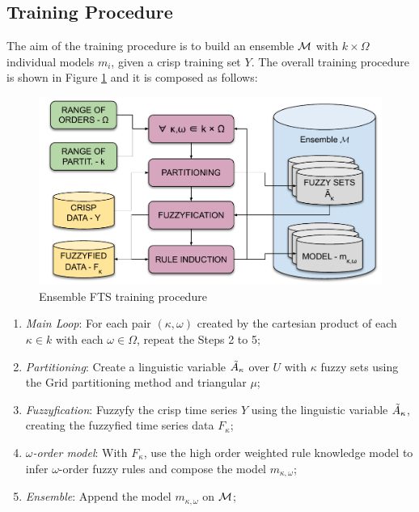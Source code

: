 %
\subsection{Training Procedure}
\label{sec:ensemblefts_training}

The aim of the training procedure is to build an ensemble $\mathcal{M}$ with $k\times\Omega$ individual models $m_i$, given a crisp training set $Y$. The overall training procedure is shown in Figure \ref{fig:ensemblefts_training} and it is composed as follows:

\begin{figure}[htb]
\includegraphics[width=\textwidth]{figures/ensemblefts_training.pdf}
\caption{Ensemble FTS training procedure}
\label{fig:ensemblefts_training}
\end{figure}

\begin{enumerate}
\item[Step 1] \textit{Main Loop}: For each pair $(\kappa,\omega)$ created by the cartesian product of each $\kappa \in k$ with each $\omega \in \Omega$, repeat the Steps 2 to 5;
\item[Step 2] \textit{Partitioning}: Create a linguistic variable $\tilde{A}_\kappa$ over $U$ with $\kappa$ fuzzy sets using the Grid partitioning method and triangular $\mu$;
\item[Step 3] \textit{Fuzzyfication}: Fuzzyfy the crisp time series $Y$ using the linguistic variable $\tilde{A}_\kappa$, creating the fuzzyfied time series data $F_\kappa$;
\item[Step 4] \textit{$\omega$-order model}: With $F_\kappa$, use the high order weighted rule knowledge model to infer  $\omega$-order fuzzy rules and compose the model $m_{\kappa,\omega}$;
\item[Step 5)] \textit{Ensemble}: Append the model $m_{\kappa,\omega}$ on $\mathcal{M}$;
\end{enumerate}

